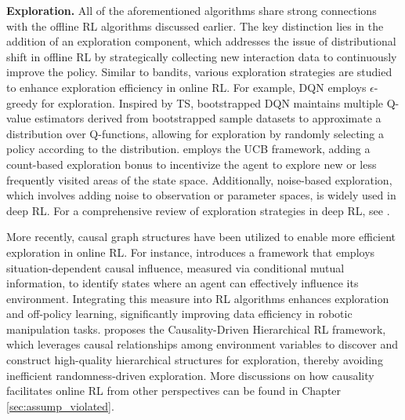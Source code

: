 \textbf{Exploration. }
All of the aforementioned algorithms share strong connections with the offline \acrshort{RL} algorithms discussed earlier. The key distinction lies in the addition of an exploration component, which addresses the issue of distributional shift in offline \acrshort{RL} by strategically collecting new interaction data to continuously improve the policy. Similar to bandits, various exploration strategies are studied to enhance exploration efficiency in online \acrshort{RL}. For example, DQN \citep{mnih2015human} employs $\epsilon$-greedy for exploration. Inspired by \acrshort{TS}, bootstrapped DQN \citep{osband2016deep} maintains multiple Q-value estimators derived from bootstrapped sample datasets to approximate a distribution over Q-functions, allowing for exploration by randomly selecting a policy according to the distribution. \citet{bellemare2016unifying} employs the \acrshort{UCB} framework, adding a count-based exploration bonus to incentivize the agent to explore new or less frequently visited areas of the state space. Additionally, noise-based exploration, which involves adding noise to observation or parameter spaces, is widely used in deep \acrshort{RL}. For a comprehensive review of exploration strategies in deep \acrshort{RL}, see \citet{ladosz2022exploration}.


More recently, causal graph structures have been utilized to enable more efficient exploration in online \acrshort{RL}. 
For instance, \citet{seitzer2021causal} introduces a framework that employs situation-dependent causal influence, measured via conditional mutual information, to identify states where an agent can effectively influence its environment. Integrating this measure into \acrshort{RL} algorithms enhances exploration and off-policy learning, significantly improving data efficiency in robotic manipulation tasks. \citet{hu2022causality} proposes the Causality-Driven Hierarchical \acrshort{RL} framework, which leverages causal relationships among environment variables to discover and construct high-quality hierarchical structures for exploration, thereby avoiding inefficient randomness-driven exploration. More discussions on how causality facilitates online \acrshort{RL} from other perspectives can be found in Chapter \ref{sec:assump_violated}.



